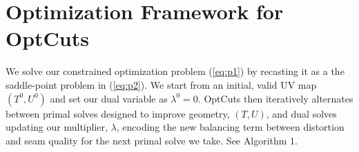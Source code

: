 
\section{Optimization Framework for OptCuts}

We solve our constrained optimization problem (\ref{eq:p1}) by recasting it as a the saddle-point problem in (\ref{eq:p2}). 
We start from an initial, valid UV map $(T^0, U^0)$ and set our dual variable as $\lambda^0 = 0$. OptCuts then iteratively alternates between primal solves designed to improve geometry, $(T, U)$, and dual solves updating our multiplier, $\lambda$,  encoding the new balancing term between distortion and seam quality for the next primal solve we take. See Algorithm 1.

%
%
%
%
%

%
%


